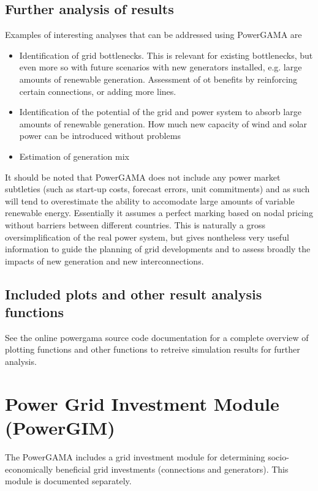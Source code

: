 \documentclass{article}
\begin{document}
\subsection{Further analysis of results}
Examples of interesting analyses that can be addressed using PowerGAMA are
\begin{itemize}
\item Identification of grid bottlenecks. This is relevant for existing bottlenecks, but even more so with future scenarios with new generators installed, e.g. large amounts of renewable generation. Assessment of ot benefits by reinforcing certain connections, or adding more lines.
\item Identification of the potential of the grid and power system to absorb large amounts of renewable generation. How much new capacity of wind and solar power can be introduced without problems
\item Estimation of generation mix 
\end{itemize}

It should be noted that PowerGAMA does not include any power market subtleties (such as start-up costs, forecast errors, unit commitments) and as such will tend to overestimate the ability to accomodate large amounts of variable renewable energy. Essentially it assumes a perfect marking based on nodal pricing without barriers between different countries. This is naturally a gross oversimplification of the real power system, but gives nontheless very useful information to guide the planning of grid developments and to assess broadly the impacts of new generation and new interconnections.


\subsection{Included plots and other result analysis functions}

See the online  powergama source code documentation for a complete overview of plotting functions and other functions to retreive simulation results for further analysis.



\section{Power Grid Investment Module (PowerGIM)}
The PowerGAMA includes a grid investment module for determining socio-economically beneficial grid investments (connections and generators). This module is documented separately.
\end{document}
